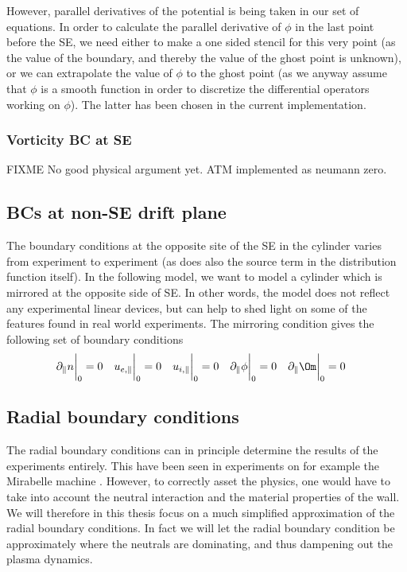 However, parallel derivatives of the potential is being taken in our set of
equations. In order to calculate the parallel derivative of $\phi$ in the last
point before the SE, we need either to make a one sided stencil for this very
point (as the value of the boundary, and thereby the value of the ghost point
is unknown), or we can extrapolate the value of $\phi$ to the ghost point (as
we anyway assume that $\phi$ is a smooth function in order to discretize the
differential operators working on $\phi$). The latter has been chosen in the
current implementation.

\subsubsection{Vorticity BC at SE}
%
%
FIXME
No good physical argument yet. ATM implemented as neumann zero.

\subsection{BCs at non-SE drift plane}
The boundary conditions at the opposite site of the SE in the cylinder varies
from experiment to experiment (as does also the source term in the distribution
function itself). In the following model, we want to model a cylinder which is
mirrored at the opposite side of SE. In other words, the model does not reflect
any experimental linear devices, but can help to shed light on some of the
features found in real world experiments. The mirroring condition gives the
following set of boundary conditions
%
\begin{align*}
    &\partial_\| n \bigg|_0    =0 &
    &u_{e,\|} \bigg|_0         =0 &
    &u_{i,\|} \bigg|_0         =0 &
    &\partial_\| \phi \bigg|_0 =0 &
    &\partial_\|\Om \bigg|_0   =0 &
\end{align*}


\subsection{Radial boundary conditions}
%
The radial boundary conditions can in principle determine the results of the
experiments entirely. This have been seen in experiments on for example the
Mirabelle machine \cite{Schroder2001}. However, to correctly asset the physics,
one would have to take into account the neutral interaction and the material
properties of the wall. We will therefore in this thesis focus on a much
simplified approximation of the radial boundary conditions. In fact we will let
the radial boundary condition be approximately where the neutrals are
dominating, and thus dampening out the plasma dynamics.

